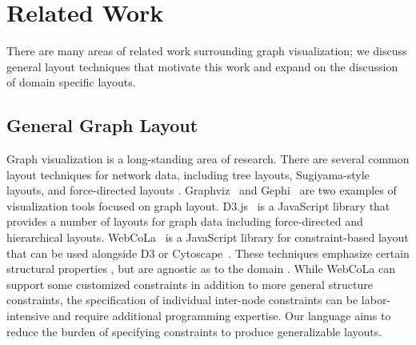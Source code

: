 \section{Related Work}
There are many areas of related work surrounding graph visualization; we
discuss general layout techniques that motivate this work and expand on the
discussion of domain specific layouts.

\subsection{General Graph Layout}
Graph visualization is a long-standing area of research. There are
several common layout techniques for network data, including tree
layouts, Sugiyama-style layouts, and force-directed layouts
\cite{herman2000graph,eades2010graph}. Graphviz~\cite{ellson2001graphviz}
and Gephi~\cite{bastian2009gephi} are two examples of visualization tools
focused on graph layout. D3.js~\cite{bostock:d3} is a JavaScript library
that provides a number of layouts for graph data including
force-directed and hierarchical layouts. WebCoLa~\cite{WebCoLa} is a
JavaScript library for constraint-based layout that can be used alongside
D3 or Cytoscape~\cite{shannon2003cytoscape}. These techniques  emphasize
certain structural properties , but are agnostic as to the domain . While
WebCoLa can support some customized constraints in addition to more general
structure constraints, the specification of individual inter-node
constraints can be labor-intensive and require additional programming
expertise. Our language aims to reduce the burden of specifying constraints
to produce generalizable layouts.


